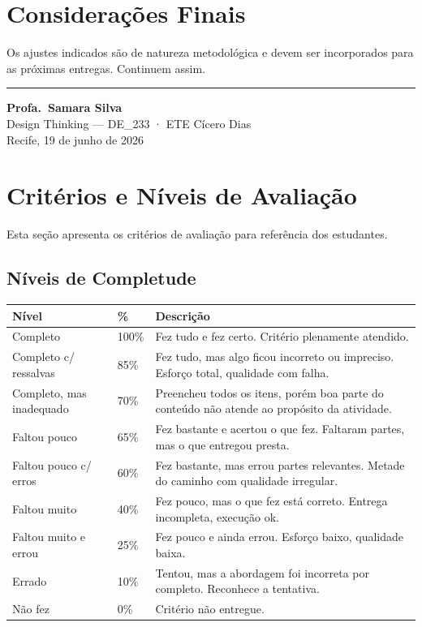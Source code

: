 \documentclass[
  sigconf,
  nonacm, %
  language=portuguese
]{acmart}
\begin{document}
\section{Considerações Finais}

Os ajustes indicados são de natureza metodológica e devem ser
incorporados para as próximas entregas.
Continuem assim.


\vspace{1.5em}
\noindent\rule{\linewidth}{0.4pt}

\begin{flushright}
\textbf{Profa.\ Samara Silva}\\
{\small\color{cmuted} Design Thinking --- DE\_233 · ETE Cícero Dias}\\
{\small\color{cmuted} Recife, 19 de junho de 2026}
\end{flushright}


\appendix
\onecolumn
\section{Critérios e Níveis de Avaliação}

Esta seção apresenta os critérios de avaliação para referência dos estudantes.

\subsection{Níveis de Completude}

\begin{tabularx}{\linewidth}{@{} p{4cm} p{1.5cm} X @{}}
\toprule
\textbf{Nível} & \textbf{\%} & \textbf{Descrição} \\
\midrule
Completo & 100\% & Fez tudo e fez certo. Critério plenamente atendido. \\
Completo c/ ressalvas & 85\% & Fez tudo, mas algo ficou incorreto ou impreciso. Esforço total, qualidade com falha. \\
Completo, mas inadequado & 70\% & Preencheu todos os itens, porém boa parte do conteúdo não atende ao propósito da atividade. \\
Faltou pouco & 65\% & Fez bastante e acertou o que fez. Faltaram partes, mas o que entregou presta. \\
Faltou pouco c/ erros & 60\% & Fez bastante, mas errou partes relevantes. Metade do caminho com qualidade irregular. \\
Faltou muito & 40\% & Fez pouco, mas o que fez está correto. Entrega incompleta, execução ok. \\
Faltou muito e errou & 25\% & Fez pouco e ainda errou. Esforço baixo, qualidade baixa. \\
Errado & 10\% & Tentou, mas a abordagem foi incorreta por completo. Reconhece a tentativa. \\
Não fez & 0\% & Critério não entregue. \\
\bottomrule
\end{tabularx}
\end{document}
